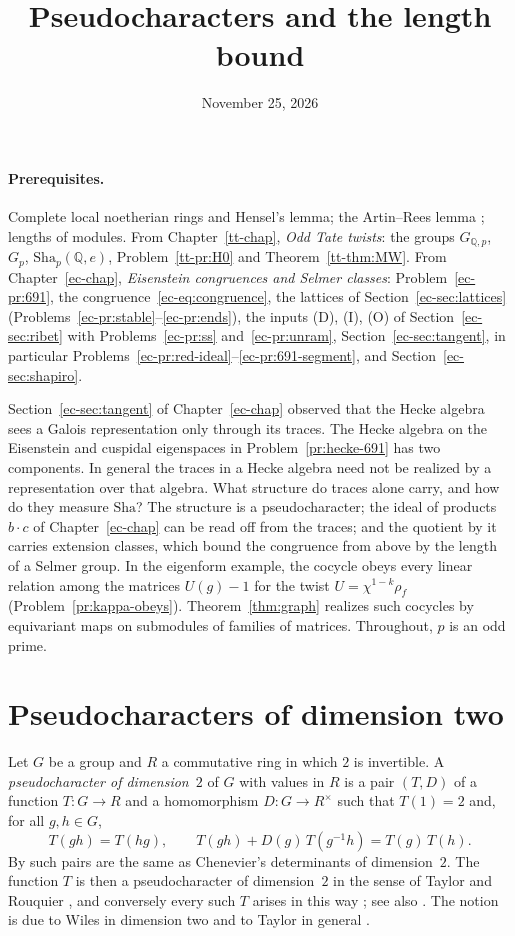 \documentclass[reqno]{amsart}
\title{Pseudocharacters and the length bound}
\author{}
\date{November 25, 2026}
\newcounter{chap}
\theoremstyle{definition}
\theoremstyle{plain}
\newcommand{\Q}{\mathbb{Q}}
\newcommand{\Sha}{\mathrm{Sha}}
\newcommand{\GQ}{G_{\Q,p}}
\begin{document}
\maketitle
{}\label{chap}

\paragraph{Prerequisites.}
Complete local noetherian rings and Hensel's lemma; the Artin--Rees lemma \cite[Cor.~10.10]{AM}; lengths of modules.  From Chapter~\ref{tt-chap}, \emph{Odd Tate twists}: the groups \(\GQ\), \(G_p\), \(\Sha_p(\Q, e)\), Problem~\ref{tt-pr:H0} and Theorem~\ref{tt-thm:MW}.  From Chapter~\ref{ec-chap}, \emph{Eisenstein congruences and Selmer classes}: Problem~\ref{ec-pr:691}, the congruence~\eqref{ec-eq:congruence}, the lattices of Section~\ref{ec-sec:lattices} (Problems~\ref{ec-pr:stable}--\ref{ec-pr:ends}), the inputs (D), (I), (O) of Section~\ref{ec-sec:ribet} with Problems~\ref{ec-pr:ss} and~\ref{ec-pr:unram}, Section~\ref{ec-sec:tangent}, in particular Problems~\ref{ec-pr:red-ideal}--\ref{ec-pr:691-segment}, and Section~\ref{ec-sec:shapiro}.

Section~\ref{ec-sec:tangent} of Chapter~\ref{ec-chap} observed that the Hecke algebra sees a Galois representation only through its traces.  The Hecke algebra on the Eisenstein and cuspidal eigenspaces in Problem~\ref{pr:hecke-691} has two components.  In general the traces in a Hecke algebra need not be realized by a representation over that algebra.  What structure do traces alone carry, and how do they measure \(\Sha\)?  The structure is a pseudocharacter; the ideal of products \(b \cdot c\) of Chapter~\ref{ec-chap} can be read off from the traces; and the quotient by it carries extension classes, which bound the congruence from above by the length of a Selmer group.  In the eigenform example, the cocycle obeys every linear relation among the matrices \(U(g)-1\) for the twist \(U=\chi^{1-k}\rho_f\) (Problem~\ref{pr:kappa-obeys}).  Theorem~\ref{thm:graph} realizes such cocycles by equivariant maps on submodules of families of matrices.  Throughout, \(p\) is an odd prime.

\section{Pseudocharacters of dimension two}\label{sec:pseudo}

Let \(G\) be a group and \(R\) a commutative ring in which \(2\) is invertible.  A \emph{pseudocharacter of dimension~\(2\)} of \(G\) with values in \(R\) is a pair \((T, D)\) of a function \(T \colon G \to R\) and a homomorphism \(D \colon G \to R^\times\) such that \(T(1) = 2\) and, for all \(g, h \in G\),
\[
  T(gh) = T(hg), \qquad T(gh) + D(g)\, T(g^{-1}h) = T(g)\, T(h) .
\]
By \cite[Lemma~1.9]{Ch} such pairs are the same as Chenevier's determinants of dimension~\(2\).  The function \(T\) is then a pseudocharacter of dimension~\(2\) in the sense of Taylor \cite[\S1]{Ta} and Rouquier \cite{Ro}, and conversely every such \(T\) arises in this way \cite[Prop.~1.29]{Ch}; see also \cite[\S1.2]{BC}.  The notion is due to Wiles in dimension two and to Taylor in general \cite[\S1.1]{BC}.
\end{document}
